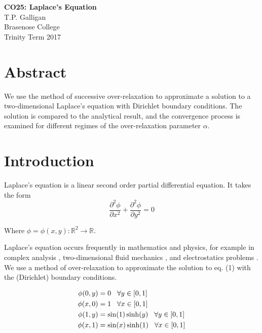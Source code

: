 \documentclass[a4paper,11pt]{article}
\begin{document}
\begin{center}
\Large{\textbf{CO25: Laplace's Equation}}\\ 
\vspace{1em}
\large{T.P. Galligan}\\
\large{Brasenose College}\\
\large{Trinity Term 2017}
\end{center}
\section{Abstract}
We use the method of successive over-relaxation to approximate a solution to a two-dimensional Laplace's equation with Dirichlet boundary conditions. The solution is compared to the analytical result, and the convergence process is examined for different regimes of the over-relaxation parameter $\alpha$. 
\section{Introduction}
Laplace's equation is a linear second order partial differential equation. It takes the form 
\begin{equation}
\frac{\partial^2\phi}{\partial x^2} + \frac{\partial^2\phi}{\partial y^2} = 0
\end{equation}

Where $\phi = \phi(x,y) : \mathbb{R}^2 \rightarrow \mathbb{R}$.\

Laplace's equation occurs frequently in mathematics and physics, for example in complex analysis \cite{complex}, two-dimensional fluid mechanics \cite{fluids}, and electrostatics problems \cite{EM}. We use a method of over-relaxation to approximate the solution to eq. (1) with the (Dirichlet) boundary conditions.

\begin{align}
\phi(0,y) &= 0 \hspace{3mm} \forall y \in [0,1]\\
\phi(x,0) &= 1 \hspace{3mm} \forall x \in [0,1]\\
\phi(1,y) &= \sin(1) \sinh(y) \hspace{3mm}\forall y \in [0,1]\\
\phi(x,1) &= \sin(x) \sinh(1) \hspace{3mm}\forall x \in [0,1]
\end{align}
\end{document}
